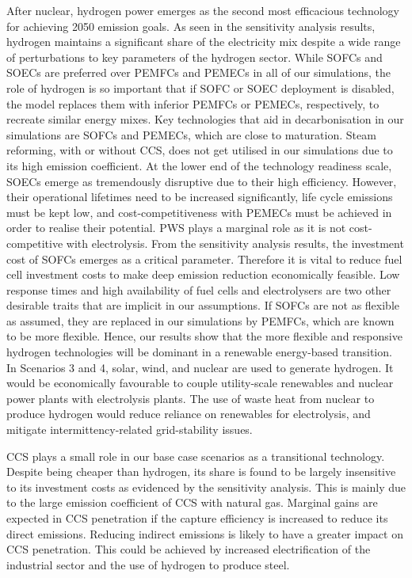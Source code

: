After nuclear, hydrogen power emerges as the second most efficacious technology for achieving 2050 emission goals. As seen in the sensitivity analysis results, hydrogen maintains a significant share of the electricity mix despite a wide range of perturbations to key parameters of the hydrogen sector. While \gls{SOFC}s and \gls{SOEC}s are preferred over \gls{PEMFC}s and \gls{PEMEC}s in all of our simulations, the role of hydrogen is so important that if \gls{SOFC} or \gls{SOEC} deployment is disabled, the model replaces them with inferior \gls{PEMFC}s or \gls{PEMEC}s, respectively, to recreate similar energy mixes. Key technologies that aid in decarbonisation in our simulations are \gls{SOFC}s and \gls{PEMEC}s, which are close to maturation. Steam reforming, with or without CCS, does not get utilised in our simulations due to its high emission coefficient. At the lower end of the technology readiness scale, \gls{SOEC}s emerge as tremendously disruptive due to their high efficiency. However, their operational lifetimes need to be increased significantly, life cycle emissions must be kept low, and cost-competitiveness with \gls{PEMEC}s must be achieved in order to realise their potential. \gls{PWS} plays a marginal role as it is not cost-competitive with electrolysis. From the sensitivity analysis results, the investment cost of \gls{SOFC}s emerges as a critical parameter. Therefore it is vital to reduce fuel cell investment costs to make deep emission reduction economically feasible. Low response times and high availability of fuel cells and electrolysers are two other desirable traits that are implicit in our assumptions. If \gls{SOFC}s are not as flexible as assumed, they are replaced in our simulations by \gls{PEMFC}s, which are known to be more flexible. Hence, our results show that the more flexible and responsive hydrogen technologies will be dominant in a renewable energy-based transition. In Scenarios 3 and 4, solar, wind, and nuclear are used to generate hydrogen. It would be economically favourable to couple utility-scale renewables and nuclear power plants with electrolysis plants. The use of waste heat from nuclear to produce hydrogen would reduce reliance on renewables for electrolysis, and mitigate intermittency-related grid-stability issues.

CCS plays a small role in our base case scenarios as a transitional technology. Despite being cheaper than hydrogen, its share is found to be largely insensitive to its investment costs as evidenced by the sensitivity analysis. This is mainly due to the large emission coefficient of \gls{CCS} with natural gas. Marginal gains are expected in \gls{CCS} penetration if the capture efficiency is increased to reduce its direct emissions. Reducing indirect emissions is likely to have a greater impact on \gls{CCS} penetration. This could be achieved by increased electrification of the industrial sector and the use of hydrogen to produce steel.

